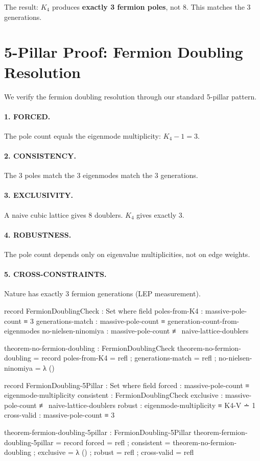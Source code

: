 \documentclass[11pt,a4paper]{book}
\begin{document}
The result: $K_4$ produces \textbf{exactly 3 fermion poles}, not 8. This matches the 3 generations.

\section{5-Pillar Proof: Fermion Doubling Resolution}

We verify the fermion doubling resolution through our standard 5-pillar pattern.

\paragraph{1. FORCED.} The pole count equals the eigenmode multiplicity: $K_4 - 1 = 3$.

\paragraph{2. CONSISTENCY.} The 3 poles match the 3 eigenmodes match the 3 generations.

\paragraph{3. EXCLUSIVITY.} A naive cubic lattice gives 8 doublers. $K_4$ gives exactly 3.

\paragraph{4. ROBUSTNESS.} The pole count depends only on eigenvalue multiplicities, not on edge weights.

\paragraph{5. CROSS-CONSTRAINTS.} Nature has exactly 3 fermion generations (LEP measurement).

\begin{code}
record FermionDoublingCheck : Set where
  field
    poles-from-K4        : massive-pole-count ≡ 3
    generations-match    : massive-pole-count ≡ generation-count-from-eigenmodes
    no-nielsen-ninomiya  : massive-pole-count ≢ naive-lattice-doublers
    
theorem-no-fermion-doubling : FermionDoublingCheck
theorem-no-fermion-doubling = record
  { poles-from-K4       = refl
  ; generations-match   = refl
  ; no-nielsen-ninomiya = λ ()
  }

record FermionDoubling-5Pillar : Set where
  field
    forced       : massive-pole-count ≡ eigenmode-multiplicity
    consistent   : FermionDoublingCheck
    exclusive    : massive-pole-count ≢ naive-lattice-doublers
    robust       : eigenmode-multiplicity ≡ K4-V ∸ 1
    cross-valid  : massive-pole-count ≡ 3

theorem-fermion-doubling-5pillar : FermionDoubling-5Pillar
theorem-fermion-doubling-5pillar = record
  { forced      = refl
  ; consistent  = theorem-no-fermion-doubling
  ; exclusive   = λ ()
  ; robust      = refl
  ; cross-valid = refl
  }
\end{code}
\end{document}
